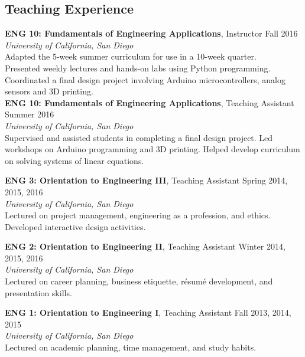 \documentclass[]{res}
\begin{document}
\begin{resume}
\section{Teaching Experience}
\vspace{0.1in}

\textbf{ENG 10: Fundamentals of Engineering Applications}, Instructor \hfill Fall 2016 \\
\textit{University of California, San Diego} \\
Adapted the 5-week summer curriculum for use in a 10-week quarter. \\
Presented weekly lectures and hands-on labs using Python programming. \\
Coordinated a final design project involving Arduino microcontrollers, analog sensors and 3D printing. \\

\textbf{ENG 10: Fundamentals of Engineering Applications}, Teaching Assistant \hfill Summer 2016 \\
\textit{University of California, San Diego} \\
Supervised and assisted students in completing a final design project.
Led workshops on Arduino programming and 3D printing.
Helped develop curriculum on solving systems of linear equations.

\textbf{ENG 3: Orientation to Engineering III}, Teaching Assistant \hfill Spring 2014, 2015, 2016 \\
\textit{University of California, San Diego} \\
Lectured on project management, engineering as a profession, and ethics. \\
Developed interactive design activities.

\textbf{ENG 2: Orientation to Engineering II}, Teaching Assistant \hfill Winter 2014, 2015, 2016 \\
\textit{University of California, San Diego} \\
Lectured on career planning, business etiquette, r\'esum\'e development, and presentation skills.

\textbf{ENG 1: Orientation to Engineering I}, Teaching Assistant \hfill Fall 2013, 2014, 2015 \\
\textit{University of California, San Diego} \\
Lectured on academic planning, time management, and study habits.


%



\end{resume}
\end{document}
